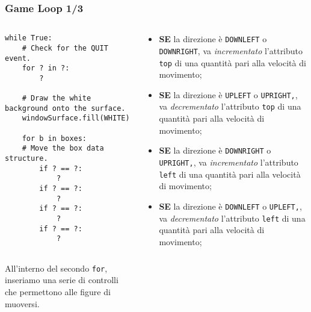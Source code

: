 \documentclass{beamer}
\begin{document}
\begin{frame}[fragile]
\frametitle{Game Loop 1/3}
\lstset{basicstyle=\tiny}
\begin{columns}
	\begin{column}[T]{0.4 \textwidth}
		\begin{lstlisting}
while True:
    # Check for the QUIT event.
    for ? in ?:
		?
		
    # Draw the white background onto the surface.
    windowSurface.fill(WHITE)
    
    for b in boxes:
    # Move the box data structure.
        if ? == ?:
            ?
        if ? == ?:
            ?
        if ? == ?:
            ?
        if ? == ?:
            ?
		
		\end{lstlisting}
		All'interno del secondo \texttt{for}, inseriamo una serie di controlli che permettono alle figure di muoversi.\\
	\end{column}
	\begin{column}[T]{0.6\textwidth}
		\begin{itemize}
		\item \textbf{SE} la direzione è \texttt{DOWNLEFT} o \texttt{DOWNRIGHT}, va \textit{incrementato} l'attributo \texttt{top} di una quantità pari alla velocità di movimento;
		\item \textbf{SE} la direzione è \texttt{UPLEFT} o \texttt{UPRIGHT,}, va \textit{decrementato} l'attributo \texttt{top} di una quantità pari alla velocità di movimento;
		\item \textbf{SE} la direzione è \texttt{DOWNRIGHT} o \texttt{UPRIGHT,}, va \textit{incrementato} l'attributo \texttt{left} di una quantità pari alla velocità di movimento;
		\item \textbf{SE} la direzione è \texttt{DOWNLEFT} o \texttt{UPLEFT,}, va \textit{decrementato} l'attributo \texttt{left} di una quantità pari alla velocità di movimento;
		\end{itemize}
		
	\end{column}
\end{columns}
\end{frame}
\end{document}
